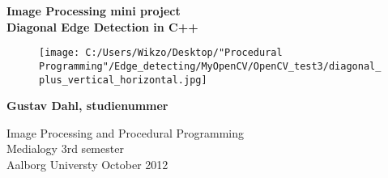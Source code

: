\thispagestyle{empty} %
\hspace{6cm} \vspace{6cm}
\begin{center}
\textbf{\Huge {Image Processing mini project}\\ \vspace{1cm}
\huge{Diagonal Edge Detection in C++}}

\begin{figure} [H]
\texttt{[image: C:/Users/Wikzo/Desktop/"Procedural Programming"/Edge\_detecting/MyOpenCV/OpenCV\_test3/diagonal\_plus\_vertical\_horizontal.jpg]}
\centering
\label{building_diagonal_edge}
\end{figure}
\end{center}

\begin{center}
\Large{\textbf{Gustav Dahl, studienummer}}
\end{center}
\vfill
Image Processing and Procedural Programming\\
Medialogy 3rd semester\\
Aalborg Universty October 2012\\
\thispagestyle{empty}
\setcounter{page}{0}